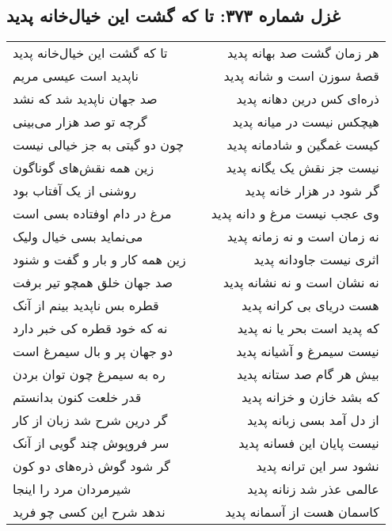 \begin{center}
\section*{غزل شماره ۳۷۳: تا که گشت این خیال‌خانه پدید}
\label{sec:373}
\begin{longtable}{l p{0.5cm} r}
تا که گشت این خیال‌خانه پدید
&&
هر زمان گشت صد بهانه پدید
\\
ناپدید است عیسی مریم
&&
قصهٔ سوزن است و شانه پدید
\\
صد جهان ناپدید شد که نشد
&&
ذره‌ای کس درین دهانه پدید
\\
گرچه تو صد هزار می‌بینی
&&
هیچکس نیست در میانه پدید
\\
چون دو گیتی به جز خیالی نیست
&&
کیست غمگین و شادمانه پدید
\\
زین همه نقش‌های گوناگون
&&
نیست جز نقش یک یگانه پدید
\\
روشنی از یک آفتاب بود
&&
گر شود در هزار خانه پدید
\\
مرغ در دام اوفتاده بسی است
&&
وی عجب نیست مرغ و دانه پدید
\\
می‌نماید بسی خیال ولیک
&&
نه زمان است و نه زمانه پدید
\\
زین همه کار و بار و گفت و شنود
&&
اثری نیست جاودانه پدید
\\
صد جهان خلق همچو تیر برفت
&&
نه نشان است و نه نشانه پدید
\\
قطره بس ناپدید بینم از آنک
&&
هست دریای بی کرانه پدید
\\
نه که خود قطره کی خبر دارد
&&
که پدید است بحر یا نه پدید
\\
دو جهان پر و بال سیمرغ است
&&
نیست سیمرغ و آشیانه پدید
\\
ره به سیمرغ چون توان بردن
&&
بیش هر گام صد ستانه پدید
\\
قدر خلعت کنون بدانستم
&&
که بشد خازن و خزانه پدید
\\
گر درین شرح شد زبان از کار
&&
از دل آمد بسی زبانه پدید
\\
سر فروپوش چند گویی از آنک
&&
نیست پایان این فسانه پدید
\\
گر شود گوش ذره‌های دو کون
&&
نشود سر این ترانه پدید
\\
شیرمردان مرد را اینجا
&&
عالمی عذر شد زنانه پدید
\\
ندهد شرح این کسی چو فرید
&&
کاسمان هست از آسمانه پدید
\\
\end{longtable}
\end{center}
